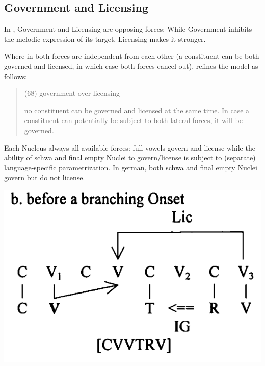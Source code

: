 \subsection{Government and Licensing}
\label{subsec:intro:gov lic}

In \CVCV, Government and Licensing are opposing forces:
While Government inhibits the melodic expression of
its target, Licensing makes it stronger.

Where in \cite{scheer2004} both forces are independent
from each other (a constituent can be both governed
and licensed, in which case both forces cancel out),
\cite{scheer2012} refines the model as follows:
\blockquote[\cite{scheer2012}]{
  (68) government over licensing
  
  no constituent can be governed and licensed at the
  same time. In case a constituent can potentially be
  subject to both lateral forces, it will be governed.
}

Each Nucleus always 
all available forces: full vowels govern and license
while the ability of schwa and final empty Nuclei to
govern/license is subject to (separate) language-specific
parametrization.
In german, both schwa and final empty Nuclei govern but
do not license.

\includegraphics[width=.5\textwidth]{figures/lic-over-branching-onset.png}


